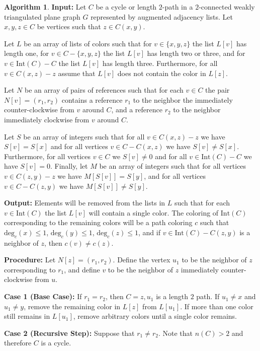 \documentclass[12pt,letterpaper]{article}
\theoremstyle{plain}
\theoremstyle{definition}
\theoremstyle{break}
\newtheorem{algorithm}[lemma]{Algorithm}     %
\begin{document}
\begin{algorithm}\label{A:hartman_impl}
\textbf{Input:} Let $C$ be a cycle or length $2$-path in a
$2$-connected weakly triangulated plane graph $G$
represented by augmented adjacency lists. Let $x,y,z\in C$ be
vertices such that $z\in C(x,y)$.

Let $L$ be an array of lists of colors
such that for $v\in\{x,y,z\}$ the list $L[v]$ has length one,
for $v\in C-\{x,y,z\}$ the list $L[v]$ has length two
or three, and for $v\in \text{Int}(C)-C$ the list
$L[v]$ has length three. Furthermore, for all $v\in C(x,z) - z$ assume
that $L[v]$ does not contain the color in $L[z]$.

Let $N$ be an array of pairs of
references such that for each $v\in C$ the pair $N[v]=(r_1,r_2)$ contains
a reference $r_1$ to the neighbor the immediately counter-clockwise
from $v$
around $C$, and a reference $r_2$
to the neighbor immediately clockwise from $v$ around $C$.

Let $S$ be an array of
integers such that for all $v\in C(x,z)-z$ we have $S[v]=S[x]$ and for
all vertices $v\in C-C(x,z)$ we have $S[v]\ne S[x]$. Furthermore, for all
vertices $v\in C$ we $S[v]\ne 0$ and for all $v\in \text{Int}(C)-C$
we have $S[v]=0$. Finally, let $M$
be an array of integers such that for all vertices $v\in C(z,y)-z$ we have
$M[S[v]]=S[y]$, and for all vertices $v\in C-C(z,y)$ we have $M[S[v]]\ne
S[y]$.

\textbf{Output:} Elements will be removed from the lists in $L$ such that
for each $v\in\text{Int}(C)$ the list $L[v]$ will contain a single color. The
coloring of $\text{Int}(C)$ corresponding to the remaining
colors will be a path
coloring $c$ such that $\text{deg}_c(x)\le1$, $\text{deg}_c(y)\le1$,
$\text{deg}_c(z)\le1$, and if $v\in\text{Int}(C)-C(z,y)$ is a neighbor of
$z$, then $c(v)\ne c(z)$.

\textbf{Procedure:} Let $N[z]=(r_1,r_2)$. Define the vertex $u_1$ to be
the neighbor of $z$ corresponding to $r_1$, and define $v$ to be the
neighbor of $z$ immediately counter-clockwise from $u$.

\textbf{Case 1 (Base Case):} If $r_1=r_2$, then $C=z,u_1$
is a length $2$ path. If $u_1\ne x$ and $u_1\ne y$, remove the remaining
color in $L[z]$ from $L[u_1]$. If more than one color still remains in
$L[u_1]$, remove arbitrary colors until a single color remains.

\textbf{Case 2 (Recursive Step):} Suppose that $r_1\ne r_2$. Note that
$n(C)>2$ and therefore $C$ is a cycle.


\end{algorithm}
\end{document}
